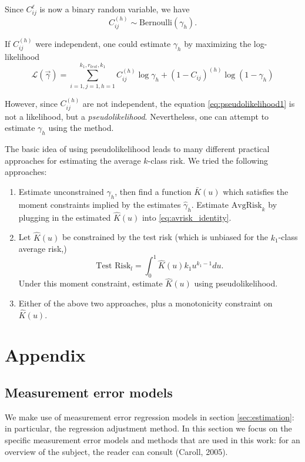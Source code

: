 \documentclass[12pt]{article}
\begin{document}
Since $C_{ij}^\ell$ is now a binary random variable, we have
\[
C_{ij}^{(h)} \sim \text{Bernoulli}(\gamma_h).
\]

If $C_{ij}^{(h)}$ were independent, one could estimate $\gamma_h$ by
maximizing the log-likelihood
\begin{equation}\label{eq:pseudolikelihood1}
\mathcal{L}(\vec{\gamma}) = \sum_{i=1,j=1,h=1}^{k_1, r_{test}, k_1} C_{ij}^{(h)} \log \gamma_h + (1-C_{ij})^{(h)} \log (1-\gamma_h)
\end{equation}

However, since $C_{ij}^{(h)}$ are not independent, the equation
\eqref{eq:pseudolikelihood1} is not a likelihood, but a
\emph{pseudolikelihood}.  Nevertheless, one can attempt to estimate
$\gamma_h$ using the method.

The basic idea of using pseudolikelihood leads to many different
practical approaches for estimating the average $k$-class risk.  We tried the following approaches:
\begin{enumerate}
\item Estimate unconstrained $\gamma_h$, then find a function
  $\bar{K}(u)$ which satisfies the moment constraints implied by the
  estimates $\hat{\gamma}_h$.  Estimate $\text{AvgRisk}_k$ by plugging
  in the estimated $\hat{K}(u)$ into \eqref{eq:avrisk_identity}.
\item Let $\hat{K}(u)$ be constrained by the test risk (which is unbiased for the $k_1$-class average risk,)
\[
\text{Test Risk}_l = \int_0^1 \hat{K}(u) k_1 u^{k_1 -1} du.
\]
Under this moment constraint, estimate $\hat{K}(u)$ using pseudolikelihood.
\item Either of the above two approaches, plus a monotonicity constraint on $\hat{K}(u).$
\end{enumerate}







\appendix
\section{Appendix}


\subsection{Measurement error models}\label{sec:me}

We make use of measurement error regression models in
section \ref{sec:estimation}: in particular, the regression adjustment
method.  In this section we focus on the specific measurement error
models and methods that are used in this work: for an overview of the
subject, the reader can consult (Caroll, 2005).
\end{document}
